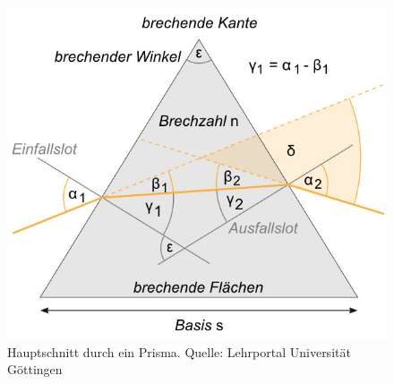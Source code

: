 \begin{figure}[ht]
	\centering
		\includegraphics[width=.75\textwidth]{Abbildungen/Hauptschnitt_lpgoe.jpg}
	\caption{Hauptschnitt durch ein Prisma. Quelle: Lehrportal Universität Göttingen}
	\label{fig:prisma2}
\end{figure}